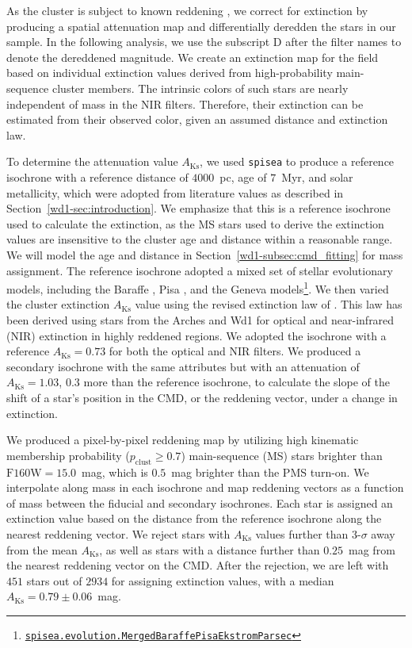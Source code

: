 \documentclass[12pt]{ucsddissertation}
\newcommand{\AKs}{A_{\mathrm{Ks}}}
\begin{document}
\begin{CJK*}{UTF8}{gbsn}
As the cluster is subject to known reddening \citep[][]{Negueruela-2022}, we correct for extinction by producing a spatial attenuation map and differentially deredden the stars in our sample. In the following analysis, we use the subscript D after the filter names to denote the dereddened magnitude. We create an extinction map for the field based on individual extinction values derived from high-probability main-sequence cluster members. The intrinsic colors of such stars are nearly independent of mass in the NIR filters. Therefore, their extinction can be estimated from their observed color, given an assumed distance and extinction law.

To determine the attenuation value $\AKs$, we used \texttt{spisea} \citep[][]{spisea} to produce a reference isochrone with a reference distance of $4000$~pc, age of $7$~Myr, and solar metallicity, which were adopted from literature values \citep[e.g.,][]{Beasor-2021, Navarete-2022} as described in Section~\ref{wd1-sec:introduction}. We emphasize that this is a reference isochrone used to calculate the extinction, as the MS stars used to derive the extinction values are insensitive to the cluster age and distance within a reasonable range. We will model the age and distance in Section~\ref{wd1-subsec:cmd_fitting} for mass assignment. The reference isochrone adopted a mixed set of stellar evolutionary models, including the Baraffe \citep[][]{Baraffe-2015}, Pisa \citep[][]{Tognelli-2011}, and the Geneva \citep[][]{Ekstrom-2012} models\footnote{\href{https://spisea.readthedocs.io/en/latest/evo_models.html\#evolution.MergedBaraffePisaEkstromParsec}{\texttt{spisea.evolution.MergedBaraffePisaEkstromParsec}}}. We then varied the cluster extinction $\AKs$ value using the revised extinction law of \citet{Hosek-2019}. This law has been derived using stars from the Arches and Wd1 for optical and near-infrared  (NIR) extinction in highly reddened regions. We adopted the isochrone with a reference $\AKs = 0.73$ for both the optical and NIR filters. We produced a secondary isochrone with the same attributes but with an attenuation of $\AKs = 1.03$, $0.3$ more than the reference isochrone, to calculate the slope of the shift of a star's position in the CMD, or the reddening vector, under a change in extinction.

We produced a pixel-by-pixel reddening map by utilizing high kinematic membership probability ($p_{\mathrm{clust}} \geq 0.7$) main-sequence (MS) stars brighter than $\mathrm{F160W} = 15.0$~mag, which is $0.5$~mag brighter than the PMS turn-on. We interpolate along mass in each isochrone and map reddening vectors as a function of mass between the fiducial and secondary isochrones. Each star is assigned an extinction value based on the distance from the reference isochrone along the nearest reddening vector.  We reject stars with $\AKs$ values further than $3$-$\sigma$ away from the mean $\AKs$, as well as stars with a distance further than $0.25$~mag from the nearest reddening vector on the CMD. After the rejection, we are left with $451$ stars out of $2934$ for assigning extinction values, with a median $\AKs = 0.79 \pm 0.06$~mag.


\end{CJK*}
\end{document}
